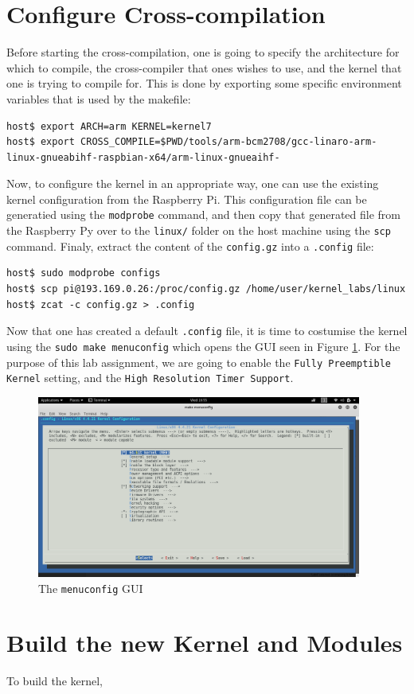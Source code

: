 \documentclass[a4paper,oneside,onecolumn]{article}
\newcommand{\code}[1]{\colorbox{codegray}{\texttt{#1}}}
\begin{document}
\section{Configure Cross-compilation}

Before starting the cross-compilation, one is going to specify the architecture for which to compile, the cross-compiler that ones wishes to use, and the kernel that one is trying to compile for. This is done by exporting some specific environment variables that is used by the makefile:
\begin{lstlisting}
host$ export ARCH=arm KERNEL=kernel7
host$ export CROSS_COMPILE=$PWD/tools/arm-bcm2708/gcc-linaro-arm-linux-gnueabihf-raspbian-x64/arm-linux-gnueaihf-
\end{lstlisting}
Now, to configure the kernel in an appropriate way, one can use the existing kernel configuration from the Raspberry Pi. This configuration file can be generatied using the \code{modprobe} command, and then copy that generated file from the Raspberry Py over to the \texttt{linux/} folder on the host machine using the \code{scp} command. Finaly, extract the content of the \texttt{config.gz} into a \texttt{.config} file:
\begin{lstlisting}
host$ sudo modprobe configs
host$ scp pi@193.169.0.26:/proc/config.gz /home/user/kernel_labs/linux
host$ zcat -c config.gz > .config
\end{lstlisting}
Now that one has created a default \texttt{.config} file, it is time to costumise the kernel using the \code{sudo make menuconfig} which opens the GUI seen in Figure \ref{fig:menuconfig}. For the purpose of this lab assignment, we are going to enable the \texttt{Fully Preemptible Kernel} setting, and the \texttt{High Resolution Timer Support}.
\begin{figure}[htbp]
	\centering
	\includegraphics[width=0.95\textwidth]{resources/meunconfig.png}
	\caption{The \texttt{menuconfig} GUI}
	\label{fig:menuconfig}
\end{figure}

\newpage
\section{Build the new Kernel and Modules}

To build the kernel,
\end{document}

